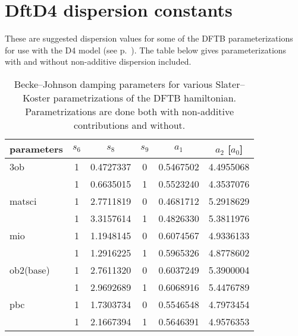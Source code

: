 
\chapter{DftD4 dispersion constants}
\label{app:dftd4const}

These are suggested dispersion values for some of the DFTB parameterizations for
use with the D4 model (see p.~). The table below gives
parameterizations with and without non-additive dispersion included.

\begin{table}[htbp]
  \caption{Becke--Johnson damping parameters for various Slater--Koster
    parametrizations of the DFTB hamiltonian. Parametrizations are done both
    with non-additive contributions and without.}
  \begin{tabular}{l*{5}{@{\qquad}c}}
    \hline
    \hline
    parameters & $s_6$ & $s_8$ & $s_9$ & $a_1$ & $a_2$ [$a_0$] \\
    \hline
    3ob
               & 1 & 0.4727337 & 0 & 0.5467502 & 4.4955068 \\
               & 1 & 0.6635015 & 1 & 0.5523240 & 4.3537076 \\
    matsci
               & 1 & 2.7711819 & 0 & 0.4681712 & 5.2918629 \\
               & 1 & 3.3157614 & 1 & 0.4826330 & 5.3811976 \\
    mio
               & 1 & 1.1948145 & 0 & 0.6074567 & 4.9336133 \\
               & 1 & 1.2916225 & 1 & 0.5965326 & 4.8778602 \\
    ob2(base)
               & 1 & 2.7611320 & 0 & 0.6037249 & 5.3900004 \\
               & 1 & 2.9692689 & 1 & 0.6068916 & 5.4476789 \\
    pbc
               & 1 & 1.7303734 & 0 & 0.5546548 & 4.7973454 \\
               & 1 & 2.1667394 & 1 & 0.5646391 & 4.9576353 \\
    \hline
    \hline
  \end{tabular}
\end{table}
